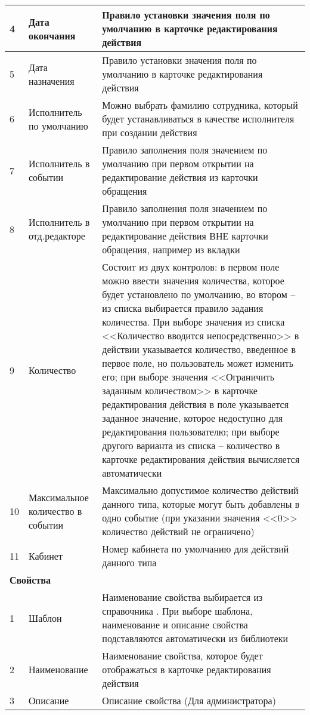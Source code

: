 {\begin{longtable}{|p{0.55cm}|p{4cm}|p{12cm}|}
4	& Дата окончания	& Правило установки значения поля \dm{Выполнено} по умолчанию в карточке редактирования действия \\ \hline
5	& Дата назначения	& Правило установки значения поля \dm{Назначено} по умолчанию в карточке редактирования действия \\ \hline
6	& Исполнитель по умолчанию &	Можно выбрать фамилию сотрудника, который будет устанавливаться в качестве исполнителя при создании действия \\ \hline
7	& Исполнитель в событии &	Правило заполнения поля \dm{Исполнитель} значением по умолчанию при первом открытии на редактирование действия из карточки обращения \\ \hline
8	& Исполнитель в отд.редакторе	& Правило заполнения поля \dm{Исполнитель} значением по умолчанию при первом открытии на редактирование действия ВНЕ карточки обращения, например из вкладки \dm{Обслуживание} \\ \hline
9	& Количество	& Состоит из двух контролов: в первом поле можно ввести значения количества, которое будет установлено по умолчанию, во втором – из списка выбирается правило задания количества. При выборе значения из списка <<Количество вводится непосредственно>> в действии указывается количество, введенное в первое поле, но пользователь может изменить его; при выборе значения <<Ограничить заданным количеством>> в карточке редактирования действия в поле \dm{Количество} указывается заданное значение, которое недоступно для редактирования пользователю; при выборе другого варианта из списка – количество в карточке редактирования действия вычисляется автоматически \\ \hline
10	& Максимальное количество в событии &	Максимально допустимое количество действий данного типа, которые могут быть добавлены в одно событие (при указании значения <<0>> количество действий не ограничено)  \\ \hline
11	& Кабинет	& Номер кабинета по умолчанию для действий данного типа \\ \hline
\multicolumn{3}{|l|}{\textbf{Свойства}} \\ \hline
1 &	Шаблон	& Наименование свойства выбирается из справочника \mm{Справочники \str Учет \str Библиотека свойств действий}. При выборе шаблона, наименование и описание свойства подставляются автоматически из библиотеки \\ \hline
2 &	Наименование	& Наименование свойства, которое будет отображаться в карточке редактирования действия \\ \hline
3	& Описание	& Описание свойства (Для администратора) \\ \hline

\end{longtable}}
